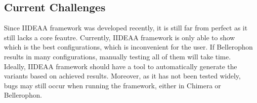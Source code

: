 \subsection{Current Challenges}
Since IIDEAA framework was developed recently, it is still far from perfect as it still lacks a core feautre. Currently, IIDEAA framework is only able to show which is the best configurations, which is inconvenient for the user. If Bellerophon results in many configurations, manually testing all of them will take time. Ideally, IIDEAA framework should have a tool to automatically generate the variants based on achieved results. Moreover, as it has not been tested widely, bugs may still occur when running the framework, either in Chimera or Bellerophon. 